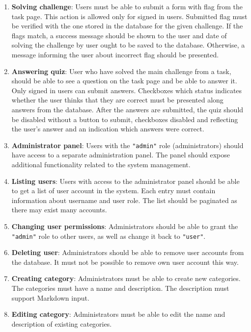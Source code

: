 \begin{enumerate}
	\item \textbf{Solving challenge}: Users must be able to submit a form with flag from the task page. This action is allowed only for signed in users. Submitted flag must be verified with the one stored in the database for the given challenge. If the flags match, a success message should be shown to the user and date of solving the challenge by user ought to be saved to the database. Otherwise, a message informing the user about incorrect flag should be presented.

	\item \textbf{Answering quiz}: User who have solved the main challenge from a task, should be able to see a question on the task page and be able to answer it. Only signed in users can submit answers. Checkboxes which status indicates whether the user thinks that they are correct must be presented along answers from the database. After the answers are submitted, the quiz should be disabled without a button to submit, checkboxes disabled and reflecting the user's answer and an indication which answers were correct.

	\item \textbf{Administrator panel}: Users with the \texttt{"admin"} role (administrators) should have access to a separate administration panel. The panel should expose additional functionality related to the system management.

	\item \textbf{Listing users}: Users with access to the administrator panel should be able to get a list of user account in the system. Each entry must contain information about username and user role. The list should be paginated as there may exist many accounts.

	\item \textbf{Changing user permissions}: Administrators should be able to grant the \texttt{"admin"} role to other users, as well as change it back to \texttt{"user"}.

	\item \textbf{Deleting user}: Administrators should be able to remove user accounts from the database. It must not be possible to remove own user account this way.

	\item \textbf{Creating category}: Administrators must be able to create new categories. The categories must have a name and description. The description must support Markdown input.

	\item \textbf{Editing category}: Administrators must be able to edit the name and description of existing categories.


\end{enumerate}
